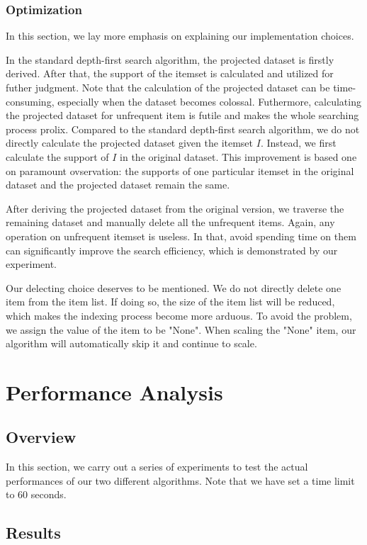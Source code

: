 \documentclass[12pt, a4paper]{report}
\begin{document}
\subsection{Optimization}
In this section, we lay more emphasis on explaining our implementation choices.

In the standard depth-first search algorithm, the projected dataset is firstly derived. After that, the support of the itemset is calculated and utilized for futher judgment. Note that the calculation of the projected dataset can be time-consuming, especially when the dataset becomes colossal. Futhermore, calculating the projected dataset for unfrequent item is futile and makes the whole searching process prolix. Compared to the standard depth-first search algorithm, we do not directly calculate the projected dataset given the itemset $I$. Instead, we first calculate the support of $I$ in the original dataset. This improvement is based one on paramount ovservation: the supports of one particular itemset in the original dataset and the projected dataset remain the same.

After deriving the projected dataset from the original version, we traverse the remaining dataset and manually delete all the unfrequent items. Again, any operation on unfrequent itemset is useless. In that, avoid spending time on them can significantly improve the search efficiency, which is demonstrated by our experiment.

Our delecting choice deserves to be mentioned. We do not directly delete one item from the item list. If doing so, the size of the item list will be reduced, which makes the indexing process become more arduous. To avoid the problem, we assign the value of the item to be "None". When scaling the "None" item, our algorithm will automatically skip it and continue to scale.

\chapter{Performance Analysis}

\section{Overview}
In this section,  we carry out a series of experiments to test the actual performances of our two different algorithms. Note that we have set a time limit to $60$ seconds.

\section{Results}
\end{document}
